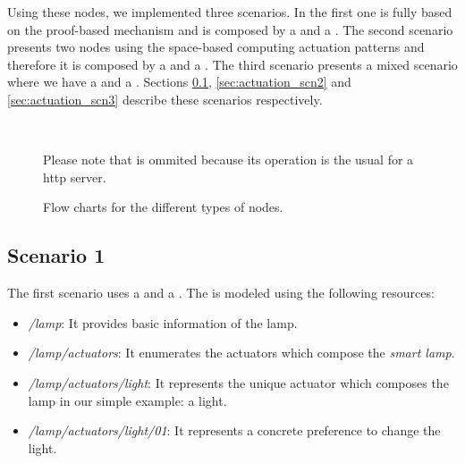 Using these nodes, we implemented three scenarios.
In the first one is fully based on the proof-based mechanism and is composed by a \prova{} and a \consc{}.
The second scenario presents two nodes using the space-based computing actuation patterns and therefore it is composed by a \provb{} and a \consd{}.
The third scenario presents a mixed scenario where we have a \prova{} and a \consd{}.
Sections \ref{sec:actuation_scn1}, \ref{sec:actuation_scn2} and \ref{sec:actuation_scn3} describe these scenarios respectively.


\begin{figure}
        \centering %
	~ %
        ~ %
        \caption{Flow charts for the different types of nodes.}
        {Please note that \typea{} is ommited because its operation is the usual for a \acs{http} server.} %
        \label{fig:flow_nodes}
\end{figure}


\subsection{Scenario 1}
\label{sec:actuation_scn1}

The first scenario uses a \prova{} and a \consc{}.
The \prova{} is modeled using the following resources:
\begin{itemize}
  \item \emph{/lamp}: It provides basic information of the lamp.
  \item \emph{/lamp/actuators}: It enumerates the actuators which compose the \emph{smart lamp}.
  \item \emph{/lamp/actuators/light}: It represents the unique actuator which composes the lamp in our simple example: a light.
  \item \emph{/lamp/actuators/light/01}: It represents a concrete preference to change the light.
\end{itemize}

